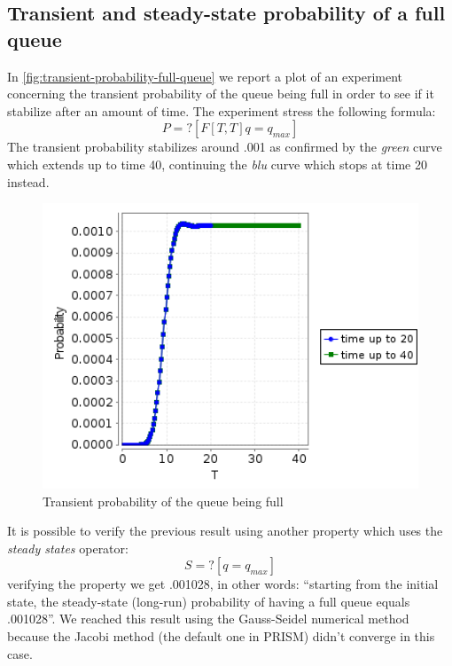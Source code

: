 \subsection{Transient and steady-state probability of a full queue}

In \autoref{fig:transient-probability-full-queue} we report a plot of
an experiment concerning the transient probability of the queue being
full in order to see if it stabilize after an amount of time. The
experiment stress the following formula:
\begin{displaymath}
   P=? [ F[T,T] q=q_{max} ]
\end{displaymath}
The transient probability stabilizes around .001 as confirmed by the
\emph{green} curve which extends up to time 40, continuing the
\emph{blu} curve which stops at time 20 instead.
\begin{figure}[htb]
  \centering
  \includegraphics[width=13cm]{quantitative-project/transient-probability-full-queue.png}
  \caption{Transient probability of the queue being full}
  \label{fig:transient-probability-full-queue}
\end{figure}
It is possible to verify the previous result using another property
which uses the \emph{steady states} operator:
\begin{displaymath}
S=? [ q=q_{max} ]
\end{displaymath}
verifying the property we get .001028, in other words: ``starting from
the initial state, the steady-state (long-run) probability of having a
full queue equals .001028''. We reached this result using the
Gauss-Seidel numerical method because the Jacobi method (the default
one in PRISM) didn't converge in this case.

